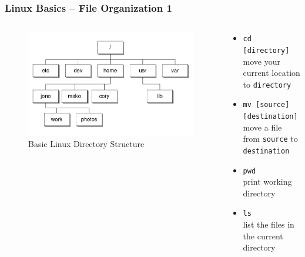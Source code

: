 \documentclass{beamer}
\begin{document}
\begin{frame}
  \frametitle{Linux Basics -- File Organization 1}
  \begin{columns}[t]
    \begin{column}{.5\textwidth}
      \begin{figure}[h]
        \centering
        \includegraphics[width=\linewidth]{filesystem.png}
        \caption{Basic Linux Directory Structure}
      \end{figure}
    \end{column}
    \begin{column}{.5\textwidth}
      \begin{itemize}
        \item \texttt{cd [directory]}\\
          move your current location to \texttt{directory}
        \item \texttt{mv [source] [destination]}\\
          move a file from \texttt{source} to \texttt{destination}
        \item \texttt{pwd} \\
          print working directory
        \item \texttt{ls} \\
          list the files in the current directory
      \end{itemize}
    \end{column}
  \end{columns}
\end{frame}
\end{document}
